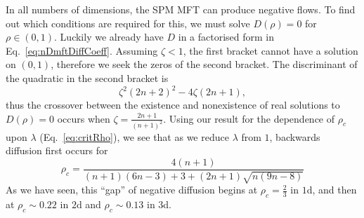 In all numbers of dimensions, the SPM MFT can produce negative flows. To find out which conditions
are required for this, we must solve $D(\rho) = 0$ for $\rho \in (0, 1)$. Luckily we already
have $D$ in a factorised form in Eq.~\eqref{eq:nDmftDiffCoeff}. Assuming $\zeta<1$, the first bracket
cannot have a solution on $(0, 1)$, therefore we seek the zeros of the second bracket. The discriminant
of the quadratic in the second bracket is
\begin{equation}
 \zeta^2 (2n+2)^2 - 4\zeta (2n+1),
\end{equation}
thus the crossover between the existence and nonexistence of real solutions to $D(\rho)=0$ occurs
when $\zeta = \frac{2n+1}{(n+1)^2}$. Using our result for the dependence of $\rho_c$ upon $\lambda$
(Eq.~\eqref{eq:critRho}), we see that as we reduce $\lambda$ from $1$, backwards diffusion first occurs for
\begin{equation}
 \rho_c = \frac{4(n+1)}{(n+1)(6 n - 3) + 3 + (2 n+1)\sqrt{n (9 n-8)}}
\end{equation}
As we have seen, this ``gap'' of negative diffusion begins at $\rho_c = \frac{2}{3}$ in $1$d, and 
then at $\rho_c\sim 0.22$ in $2$d and $\rho_c\sim 0.13$ in $3$d.


